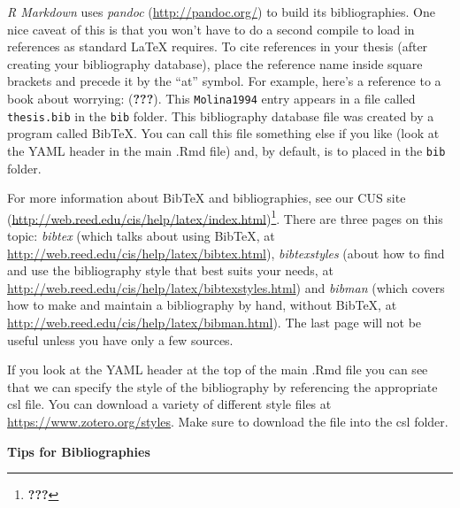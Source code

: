 \documentclass[12pt,twoside]{reedthesis}
\theoremstyle{definition}
\theoremstyle{definition}
\theoremstyle{remark}
\begin{document}
  \emph{R Markdown} uses \emph{pandoc} (\url{http://pandoc.org/}) to build
  its bibliographies. One nice caveat of this is that you won't have to do
  a second compile to load in references as standard LaTeX requires. To
  cite references in your thesis (after creating your bibliography
  database), place the reference name inside square brackets and precede
  it by the ``at'' symbol. For example, here's a reference to a book about
  worrying: ({\textbf{???}}). This \texttt{Molina1994} entry appears in a
  file called \texttt{thesis.bib} in the \texttt{bib} folder. This
  bibliography database file was created by a program called BibTeX. You
  can call this file something else if you like (look at the YAML header
  in the main .Rmd file) and, by default, is to placed in the \texttt{bib}
  folder.
  
  For more information about BibTeX and bibliographies, see our CUS site
  (\url{http://web.reed.edu/cis/help/latex/index.html})\footnote{\textbf{???}}.
  There are three pages on this topic: \emph{bibtex} (which talks about
  using BibTeX, at \url{http://web.reed.edu/cis/help/latex/bibtex.html}),
  \emph{bibtexstyles} (about how to find and use the bibliography style
  that best suits your needs, at
  \url{http://web.reed.edu/cis/help/latex/bibtexstyles.html}) and
  \emph{bibman} (which covers how to make and maintain a bibliography by
  hand, without BibTeX, at
  \url{http://web.reed.edu/cis/help/latex/bibman.html}). The last page
  will not be useful unless you have only a few sources.
  
  If you look at the YAML header at the top of the main .Rmd file you can
  see that we can specify the style of the bibliography by referencing the
  appropriate csl file. You can download a variety of different style
  files at \url{https://www.zotero.org/styles}. Make sure to download the
  file into the csl folder.
  
  \textbf{Tips for Bibliographies}
  
\end{document}

